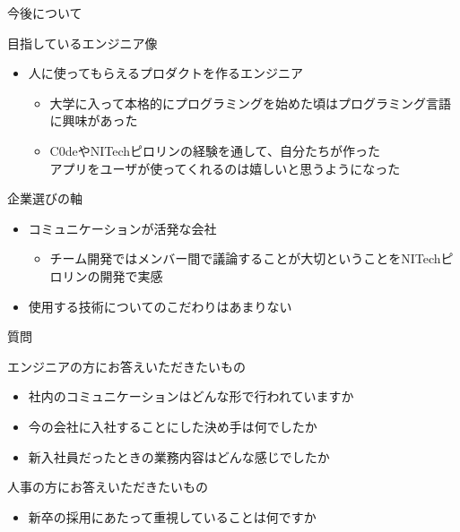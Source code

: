 \documentclass[12pt, unicode]{beamer}
\begin{document}
\begin{frame}{今後について}
  \begin{block}{目指しているエンジニア像}
    \begin{itemize}
      \item 人に使ってもらえるプロダクトを作るエンジニア
      \begin{itemize}
        \item 大学に入って本格的にプログラミングを始めた頃はプログラミング言語に興味があった
        \item C0deやNITechピロリンの経験を通して、自分たちが作った\\アプリをユーザが使ってくれるのは嬉しいと思うようになった
      \end{itemize}
    \end{itemize}
  \end{block}

  \begin{block}{企業選びの軸}
    \begin{itemize}
      \item コミュニケーションが活発な会社
      \begin{itemize}
        \item チーム開発ではメンバー間で議論することが大切ということをNITechピロリンの開発で実感
      \end{itemize}
      \item 使用する技術についてのこだわりはあまりない
    \end{itemize}
  \end{block}
\end{frame}

\begin{frame}{質問}
  \begin{block}{エンジニアの方にお答えいただきたいもの}
    \begin{itemize}
      \item 社内のコミュニケーションはどんな形で行われていますか
      \item 今の会社に入社することにした決め手は何でしたか
      \item 新入社員だったときの業務内容はどんな感じでしたか
    \end{itemize}
  \end{block}

  \begin{block}{人事の方にお答えいただきたいもの}
    \begin{itemize}
      \item 新卒の採用にあたって重視していることは何ですか
    \end{itemize}
  \end{block}
\end{frame}
\end{document}
